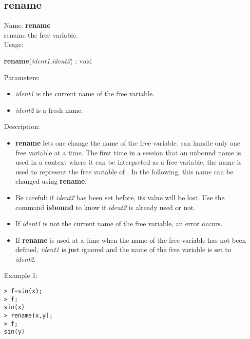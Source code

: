 \subsection{rename}
\label{labrename}
\noindent Name: \textbf{rename}\\
rename the free variable.\\

\noindent Usage: 
\begin{center}
\textbf{rename}(\emph{ident1},\emph{ident2}) : \textsf{void}\\
\end{center}
Parameters: 
\begin{itemize}
\item \emph{ident1} is the current name of the free variable.
\item \emph{ident2} is a fresh name.
\end{itemize}
\noindent Description: \begin{itemize}

\item \textbf{rename} lets one change the name of the free variable. \sollya can handle only
   one free variable at a time. The first time in a session that an unbound name 
   is used in a context where it can be interpreted as a free variable, the name
   is used to represent the free variable of \sollya. In the following, this name
   can be changed using \textbf{rename}.

\item Be careful: if \emph{ident2} has been set before, its value will be lost. Use the 
   command \textbf{isbound} to know if \emph{ident2} is already used or not.

\item If \emph{ident1} is not the current name of the free variable, an error occurs.

\item If \textbf{rename} is used at a time when the name of the free variable has not been 
   defined, \emph{ident1} is just ignored and the name of the free variable is 
   set to \emph{ident2}.
\end{itemize}
\noindent Example 1: 
\begin{center}\begin{minipage}{15cm}\begin{Verbatim}[frame=single]
> f=sin(x);
> f;
sin(x)
> rename(x,y);
> f;
sin(y)
\end{Verbatim}
\end{minipage}\end{center}
